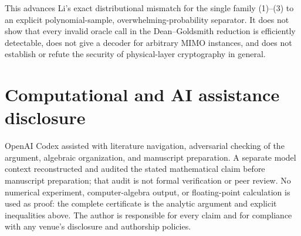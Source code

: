 \documentclass[11pt]{article}
\theoremstyle{remark}
\begin{document}
This advances Li's exact distributional mismatch for the single family
(1)--(3) to an explicit polynomial-sample, overwhelming-probability
separator.  It does not show that every invalid oracle call in the
Dean--Goldsmith reduction is efficiently detectable, does not give a
decoder for arbitrary MIMO instances, and does not establish or refute
the security of physical-layer cryptography in general.

\section*{Computational and AI assistance disclosure}

OpenAI Codex assisted with literature navigation, adversarial checking of
the argument, algebraic organization, and manuscript preparation.  A
separate model context reconstructed and audited the stated mathematical
claim before manuscript preparation; that audit is not formal
verification or peer review.  No numerical experiment, computer-algebra
output, or floating-point calculation is used as proof: the complete
certificate is the analytic argument and explicit inequalities above.
The author is responsible for every claim and for compliance with any
venue's disclosure and authorship policies.



\end{document}
